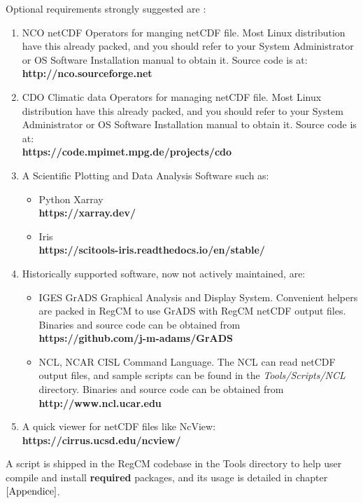 Optional requirements strongly suggested are :

\begin{enumerate}
\item NCO netCDF Operators for manging netCDF file. Most Linux distribution
have this already packed, and you should refer to your System Administrator or
OS Software Installation manual to obtain it. Source code is at: \\
{\bf http://nco.sourceforge.net}
\item CDO Climatic data Operators for managing netCDF file. Most Linux
distribution have this already packed, and you should refer to your System
Administrator or OS Software Installation manual to obtain it.
Source code is at: \\
{\bf https://code.mpimet.mpg.de/projects/cdo }
\item A Scientific Plotting and Data Analysis Software such as:
\begin{itemize}
\item Python Xarray \\ {\bf https://xarray.dev/ }
\item Iris \\ {\bf https://scitools-iris.readthedocs.io/en/stable/ }
\end{itemize}
\item Historically supported software, now not actively maintained, are:
\begin{itemize}
    \item IGES GrADS Graphical Analysis and Display System. Convenient helpers
are packed in RegCM to use GrADS with RegCM netCDF output files.
Binaries and source code can be obtained from \\
        {\bf https://github.com/j-m-adams/GrADS}
    \item NCL, NCAR CISL Command Language. The NCL can read netCDF output files, and sample scripts can be found in the {\em Tools/Scripts/NCL} directory.
Binaries and source code can be obtained from \\
{\bf http://www.ncl.ucar.edu}
\end{itemize}
\item A quick viewer for netCDF files like NcView: \\
{\bf https://cirrus.ucsd.edu/ncview/}
\end{enumerate}

A script is shipped in the RegCM codebase in the Tools directory to help
user compile and install {\bf required} packages, and its usage is detailed in
chapter $\ref{Appendice}$.

